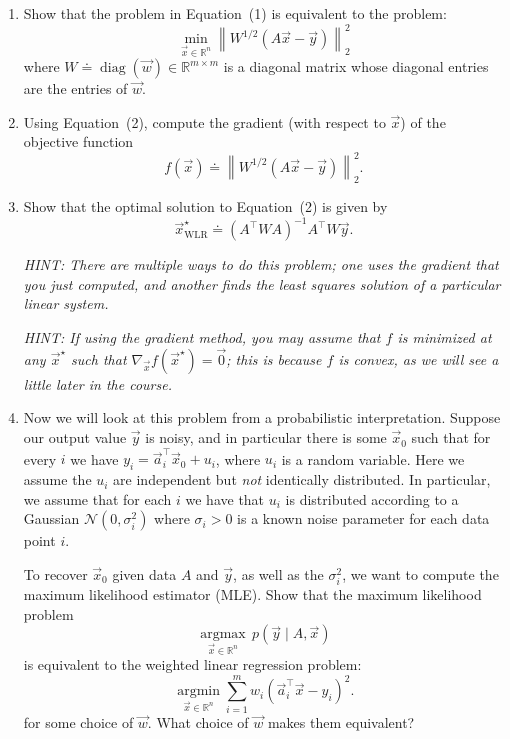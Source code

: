 \documentclass[10pt]{article}
\newcommand{\RR}{\mathbb{R}}
\newcommand{\NN}{\mathcal{N}}
\begin{document}
\begin{enumerate}[label=(\alph*)]
    \item Show that the problem in Equation~(1) is equivalent to the problem:
    \begin{equation}
        \min_{\vec{x} \in \RR^n} \left\| W^{1/2}(A\vec{x} - \vec{y}) \right\|_2^2
    \end{equation}
    where $W \doteq \operatorname{diag}(\vec{w}) \in \RR^{m \times m}$ is a diagonal matrix whose diagonal entries are the entries of $\vec{w}$.

    \item Using Equation~(2), compute the gradient (with respect to $\vec{x}$) of the objective function
    \begin{equation}
        f(\vec{x}) \doteq \left\| W^{1/2}(A\vec{x} - \vec{y}) \right\|_2^2.
    \end{equation}

    \item Show that the optimal solution to Equation~(2) is given by
    \begin{equation}
        \vec{x}^\star_{\mathrm{WLR}} \doteq (A^\top W A)^{-1} A^\top W \vec{y}.
    \end{equation}

    \emph{HINT: There are multiple ways to do this problem; one uses the gradient that you just computed, and another finds the least squares solution of a particular linear system.}

    \emph{HINT: If using the gradient method, you may assume that $f$ is minimized at any $\vec{x}^\star$ such that $\nabla_{\vec{x}} f(\vec{x}^\star) = \vec{0}$; this is because $f$ is convex, as we will see a little later in the course.}

    \item Now we will look at this problem from a probabilistic interpretation. Suppose our output value $\vec{y}$ is noisy, and in particular there is some $\vec{x}_0$ such that for every $i$ we have $y_i = \vec{a}_i^\top \vec{x}_0 + u_i$, where $u_i$ is a random variable. Here we assume the $u_i$ are independent but \emph{not} identically distributed. In particular, we assume that for each $i$ we have that $u_i$ is distributed according to a Gaussian $\NN(0, \sigma_i^2)$ where $\sigma_i > 0$ is a known noise parameter for each data point $i$.

    To recover $\vec{x}_0$ given data $A$ and $\vec{y}$, as well as the $\sigma_i^2$, we want to compute the maximum likelihood estimator (MLE). Show that the maximum likelihood problem
    \begin{equation}
        \operatorname*{argmax}_{\vec{x} \in \RR^n}\, p(\vec{y} \mid A, \vec{x})
    \end{equation}
    is equivalent to the weighted linear regression problem:
    \begin{equation}
        \operatorname*{argmin}_{\vec{x} \in \RR^n} \sum_{i=1}^{m} w_i (\vec{a}_i^\top \vec{x} - y_i)^2.
    \end{equation}
    for some choice of $\vec{w}$. What choice of $\vec{w}$ makes them equivalent?


\end{enumerate}
\end{document}
